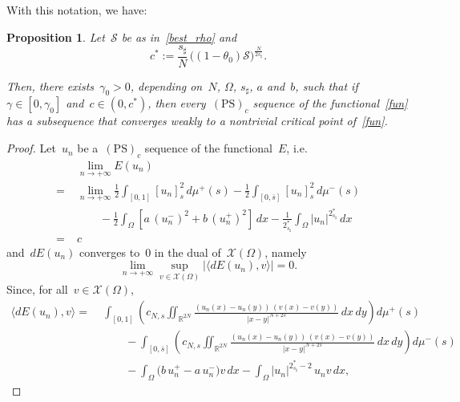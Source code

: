 \documentclass[12pt,a4paper,intlimits,sumlimits]{amsart}
\def \R {\mathbb{R}}
\newcommand{\half}{\frac{1}{2}}
\newcommand{\PS}[1]{$(\text{PS})_{#1}$}
\theoremstyle{definition}
\theoremstyle{plain}
\newtheorem{proposition}[definition]{Proposition}
\numberwithin{equation}{section}
\begin{document}
With this notation, we have:

\begin{proposition}\label{P51}
Let~$\mathcal S$ be as in~\eqref{best_rho} and
\begin{equation}\label{CASTA}
c^\ast:= \frac{s_\sharp}{N}\, \big((1-\theta_0)\mathcal S \big)^{\frac{N}{2 s_\sharp}}.
\end{equation}

Then, there exists~$\gamma_0>0$, depending on~$N$, $\Omega$,
$s_\sharp$, $a$ and~$b$, such that if~$\gamma\in[0,\gamma_0]$
and~$c \in (0,c^\ast)$,
then every~\PS{c} sequence of the functional~\eqref{fun} has a subsequence that converges weakly to a nontrivial critical point of~\eqref{fun}.
\end{proposition}

\begin{proof}
Let~$u_n$ be a~\PS{c} sequence of the functional~$E$, i.e.
\begin{equation}\label{c1}
\begin{split}&
\lim_{n\to+\infty}
E(u_n) \\
= \;&\lim_{n\to+\infty}\half  \int_{[{{ 0 }}, 1]} [u_n]^2_{s}\, d\mu^+ (s)
-\half\int_{[{{ 0 }}, \overline s]} [u_n]^2_s \, d\mu^-(s)
\\&\qquad - \half \int_\Omega \left[a\, (u_n^-)^2 + b\, (u_n^+)^2\right] \,dx - \frac{1}{2_{s_\sharp}^*} \int_\Omega |u_n|^{2_{s_\sharp}^*}\, dx\\= \;&c
\end{split}
\end{equation}
and~$ dE (u_n)$ converges to~$0$ in the dual of~$\mathcal{X}(\Omega)$,
namely
\begin{equation}\label{c2}
\lim_{n\to+\infty}\sup_{ v \in \mathcal{X}(\Omega)}\big|\langle dE (u_n), v\rangle\big| =0.
\end{equation}
Since, for all~$v \in \mathcal{X}(\Omega)$,
\begin{equation*}\begin{split}
\langle dE (u_n), v\rangle =
\;& \int_{[{{ 0 }}, 1]}\left(c_{N,s}
\iint_{\R^{2N}} \frac{(u_n(x) - u_n(y))\, (v(x) - v(y))}{|x - y|^{N+2s}}\, dx\, dy\right) d\mu^+(s)\\
&\qquad- \int_{[{{ 0 }}, \overline s]}\left(c_{N,s}
\iint_{\R^{2N}} \frac{(u_n(x) - u_n(y))\, (v(x) - v(y))}{|x - y|^{N+2s}}\, dx\, dy\right) d\mu^-(s)\\
&\qquad -\int_\Omega \big(b\, u_n^+ -a\, u_n^-\big)v \, dx - \int_\Omega |u_n|^{2_{s_\sharp}^\ast - 2}\, u_n v\, dx,
\end{split}

\end{equation*}
\end{proof}
\end{document}
